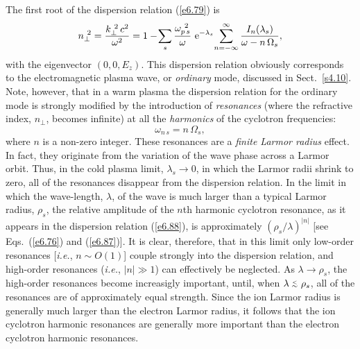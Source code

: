 The first root of the dispersion relation (\ref{e6.79}) is
\begin{equation}\label{e6.88}
n_\perp^{~2}=\frac{k_\perp^{~2}\,c^2}{\omega^2} = 1 - \!
\sum_s \frac{\omega_{p\,s}^{~2}}{\omega}\,\,
{\rm e}^{-\lambda_s} \!\sum_{n=-\infty}^\infty
\frac{I_n(\lambda_s)}{\omega-n\,{\Omega}_s},
\end{equation}
with the eigenvector $(0,0,E_z)$. This dispersion relation obviously
corresponds to the electromagnetic plasma wave, or {\em ordinary}\/ mode, discussed 
in Sect.~\ref{s4.10}.
Note, however, that in a warm plasma the dispersion relation for the ordinary mode
is strongly modified by the introduction of {\em resonances}\/ (where the refractive
 index, $n_\perp$,
becomes infinite) at all the {\em harmonics}\/ of the cyclotron frequencies:
\begin{equation}
\omega_{n\,s} = n\,{\Omega}_s,
\end{equation}
where $n$ is a non-zero integer. These resonances are a {\em finite Larmor radius}\/ 
effect. In fact, they originate from the variation of the wave phase 
across a Larmor orbit. Thus, in the cold plasma limit, $\lambda_s\rightarrow 0$,
in which the Larmor radii shrink to zero, all of the resonances disappear from
the dispersion relation. In the limit in which the wave-length, $\lambda$, of
the wave is much larger than a typical Larmor radius, $\rho_s$, the
relative amplitude of the $n$th harmonic cyclotron resonance, as it
appears in the dispersion
relation (\ref{e6.88}), is approximately 
$(\rho_s/\lambda)^{|n|}$ [see Eqs.~(\ref{e6.76}) and (\ref{e6.87})]. It is clear, therefore, that
in this limit only low-order resonances [{\em i.e.}, $n\sim O(1)$] couple
strongly into the dispersion relation, and high-order resonances
({\em i.e.}, $|n| \gg 1$) can effectively be neglected. As $\lambda\rightarrow
\rho_s$, the high-order resonances become increasigly important, until,
when $\lambda\stackrel {_{\normalsize<}}{_{\normalsize \sim}} \rho_s$, all of the resonances are of approximately equal
strength. Since the ion Larmor radius is generally much larger than the
electron Larmor radius, it follows that the ion cyclotron harmonic resonances
are generally more important than the electron cyclotron harmonic resonances.

